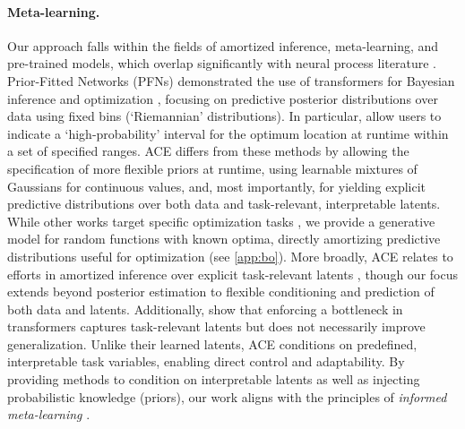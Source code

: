 \documentclass[twoside]{article}
\begin{document}
\paragraph{Meta-learning.} Our approach falls within the fields of amortized inference, meta-learning, and pre-trained models, which overlap significantly with neural process literature \citep{finn2017model, finn2018probabilistic}. Prior-Fitted Networks (PFNs) demonstrated the use of transformers for Bayesian inference \citep{muller2022transformers} and optimization \citep{muller2023pfns4bo}, focusing on predictive posterior distributions over data using fixed bins (`Riemannian' distributions). In particular, \citet{muller2023pfns4bo} allow users to indicate a `high-probability' interval for the optimum location at runtime within a set of specified ranges. ACE differs from these methods by allowing the specification of more flexible priors at runtime, using learnable  mixtures of Gaussians for continuous values, and, most importantly, for yielding explicit predictive distributions over both data and task-relevant, interpretable latents. While other works target specific optimization tasks \citep{liu2020task, simpson2021kernel, amos2022tutorial}, we provide a generative model for random functions with known optima, directly amortizing predictive distributions useful for optimization (see \cref{app:bo}). More broadly, ACE relates to efforts in amortized inference over explicit task-relevant latents \citep{mittal2023exploring}, though our focus extends beyond posterior estimation to flexible conditioning and prediction of both data and latents. Additionally, \citet{mittal2024does} show that enforcing a bottleneck in transformers captures task-relevant latents but does not necessarily improve generalization. Unlike their learned latents, ACE conditions on predefined, interpretable task variables, enabling direct control and adaptability. 
By providing methods to condition on interpretable latents as well as injecting probabilistic knowledge (priors), our work aligns with the principles of \emph{informed meta-learning} \citep{kobalczyk2024informed}. 

\vspace{-0.25em}
\end{document}
